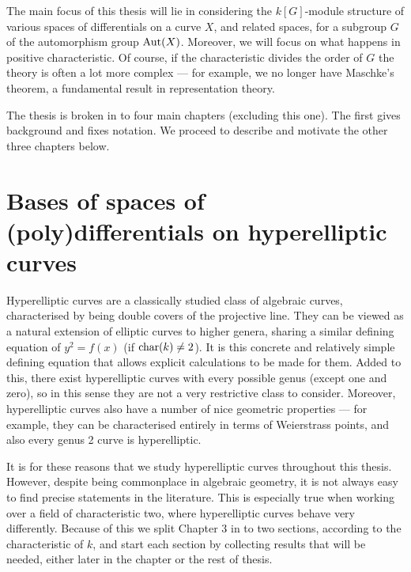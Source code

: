 The main focus of this thesis will lie in considering the $k[G]$-module structure of various spaces of differentials on a curve $X$, and related spaces, for a subgroup $G$ of the automorphism group $\operatorname{Aut}(X)$.
Moreover, we will focus on what happens in positive characteristic.
Of course, if the characteristic divides the order of $G$ the theory is often a lot more complex --- for example, we no longer have Maschke's theorem, a fundamental result in representation theory.

The thesis is broken in to four main chapters (excluding this one).
The first gives background and fixes notation.
We proceed to describe and motivate the other three chapters below.

\section{Bases of spaces of (poly)differentials on hyperelliptic curves}

Hyperelliptic curves are a classically studied class of algebraic curves, characterised by being double covers of the projective line.
They can be viewed as a natural extension of elliptic curves to higher genera, sharing a similar defining equation of $y^2 = f(x)$ (if $\operatorname{char}(k) \neq 2$).
It is this concrete and relatively simple defining equation that allows explicit calculations to be made for them.
Added to this, there exist hyperelliptic curves with every possible genus (except one and zero), so in this sense they are not a very restrictive class to consider.
Moreover, hyperelliptic curves also have a number of nice geometric properties --- for example, they can be characterised entirely in terms of Weierstrass points, and also every genus 2 curve is hyperelliptic.

It is for these reasons that we study hyperelliptic curves throughout this thesis.
However, despite being commonplace in algebraic geometry, it is not always easy to find precise statements in the literature.
This is especially true when working over a field of characteristic two, where hyperelliptic curves behave very differently.
Because of this we split Chapter $3$ in to two sections, according to the characteristic of $k$, and start each section by collecting results that will be needed, either later in the chapter or the rest of thesis.

